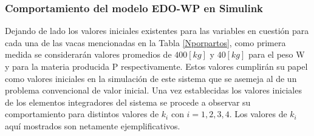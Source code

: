 \pagebreak
\subsubsection{Comportamiento del modelo EDO-WP en Simulink} \label{simulwp}

Dejando de lado los valores iniciales existentes para las variables en cuestión para cada una de las vacas mencionadas en la Tabla \ref{Nporpartos}, como primera medida se considerarán valores promedios de $400[kg]$ y $40[kg]$ para el peso W y para la materia producida P respectivamente. Estos valores cumplirán su papel como valores iniciales en la simulación de este sistema que se asemeja al de un problema convencional de valor inicial. Una vez establecidas los valores iniciales de los elementos integradores del sistema se procede a observar su comportamiento para distintos valores de $k_{i}$ con $i=1,2,3,4$. Los valores de $k_{i}$ aquí mostrados son netamente ejemplificativos.

